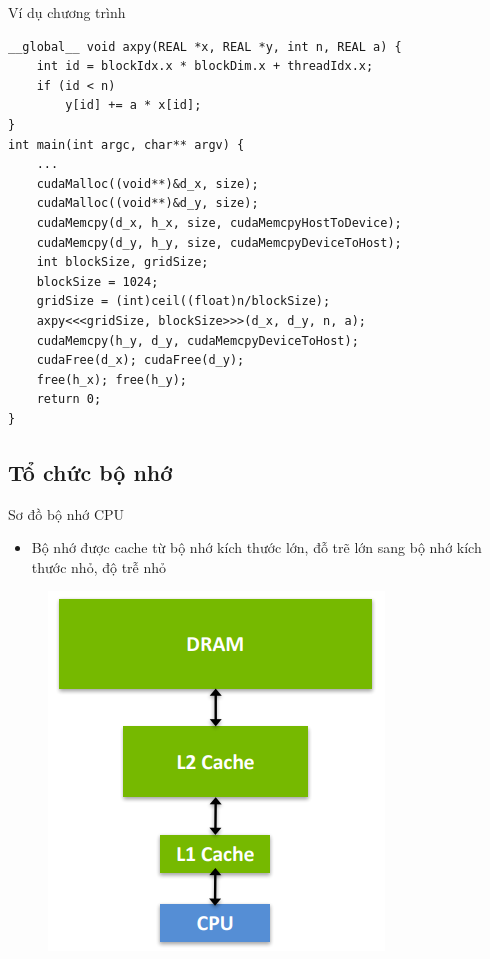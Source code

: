 \documentclass[10pt]{beamer}
\theoremstyle{remark}
\numberwithin{algocf}{section}
\numberwithin{equation}{section}
\numberwithin{dl}{section}
\numberwithin{figure}{section}
\begin{document}
\begin{frame}{Ví dụ chương trình}
\begin{verbatim}
__global__ void axpy(REAL *x, REAL *y, int n, REAL a) {
    int id = blockIdx.x * blockDim.x + threadIdx.x;
    if (id < n)
        y[id] += a * x[id];
}
int main(int argc, char** argv) {
    ...
    cudaMalloc((void**)&d_x, size);
    cudaMalloc((void**)&d_y, size);
    cudaMemcpy(d_x, h_x, size, cudaMemcpyHostToDevice);
    cudaMemcpy(d_y, h_y, size, cudaMemcpyDeviceToHost);
    int blockSize, gridSize;
    blockSize = 1024;
    gridSize = (int)ceil((float)n/blockSize);
    axpy<<<gridSize, blockSize>>>(d_x, d_y, n, a);
    cudaMemcpy(h_y, d_y, cudaMemcpyDeviceToHost);
    cudaFree(d_x); cudaFree(d_y);
    free(h_x); free(h_y);
    return 0;
}
\end{verbatim}
    
\end{frame}

\subsection{Tổ chức bộ nhớ}

\begin{frame}{Sơ đồ bộ nhớ CPU}
    \begin{itemize}
        \item Bộ nhớ được cache từ bộ nhớ kích thước lớn, đỗ trẽ lớn sang bộ nhớ kích thước nhỏ, độ trễ nhỏ
    \end{itemize}

    \begin{figure}[H]
        \centering
        \includegraphics[height=0.6\textheight]{figures/CUDA/CPU_Memory_Hierachy.png}
    \end{figure}
\end{frame}
\end{document}
